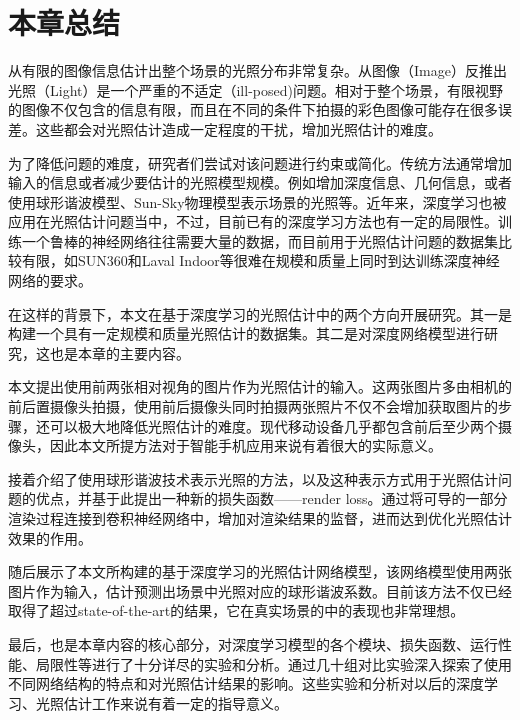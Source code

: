 \section{本章总结}
从有限的图像信息估计出整个场景的光照分布非常复杂。从图像（Image）反推出光照（Light）是一个严重的不适定（ill-posed)问题。相对于整个场景，有限视野的图像不仅包含的信息有限，而且在不同的条件下拍摄的彩色图像可能存在很多误差。这些都会对光照估计造成一定程度的干扰，增加光照估计的难度。

为了降低问题的难度，研究者们尝试对该问题进行约束或简化。传统方法通常增加输入的信息或者减少要估计的光照模型规模。例如增加深度信息、几何信息，或者使用球形谐波模型、Sun-Sky物理模型表示场景的光照等。近年来，深度学习也被应用在光照估计问题当中，不过，目前已有的深度学习方法也有一定的局限性。训练一个鲁棒的神经网络往往需要大量的数据，而目前用于光照估计问题的数据集比较有限，如SUN360\cite{xiao2012recognizing}和Laval Indoor\cite{gardner2017learning}等很难在规模和质量上同时到达训练深度神经网络的要求。

在这样的背景下，本文在基于深度学习的光照估计中的两个方向开展研究。其一是构建一个具有一定规模和质量光照估计的数据集。其二是对深度网络模型进行研究，这也是本章的主要内容。

本文提出使用前两张相对视角的图片作为光照估计的输入。这两张图片多由相机的前后置摄像头拍摄，使用前后摄像头同时拍摄两张照片不仅不会增加获取图片的步骤，还可以极大地降低光照估计的难度。现代移动设备几乎都包含前后至少两个摄像头，因此本文所提方法对于智能手机应用来说有着很大的实际意义。

接着介绍了使用球形谐波技术表示光照的方法，以及这种表示方式用于光照估计问题的优点，并基于此提出一种新的损失函数——render loss。通过将可导的一部分渲染过程连接到卷积神经网络中，增加对渲染结果的监督，进而达到优化光照估计效果的作用。

随后展示了本文所构建的基于深度学习的光照估计网络模型，该网络模型使用两张图片作为输入，估计预测出场景中光照对应的球形谐波系数。目前该方法不仅已经取得了超过state-of-the-art的结果，它在真实场景的中的表现也非常理想。

最后，也是本章内容的核心部分，对深度学习模型的各个模块、损失函数、运行性能、局限性等进行了十分详尽的实验和分析。通过几十组对比实验深入探索了使用不同网络结构的特点和对光照估计结果的影响。这些实验和分析对以后的深度学习、光照估计工作来说有着一定的指导意义。